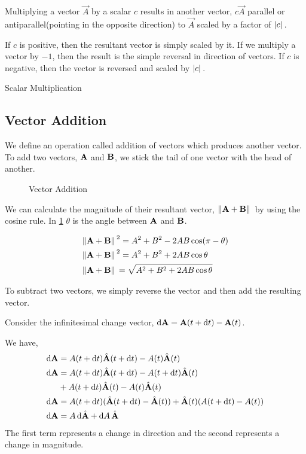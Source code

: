 Multiplying a vector \(\vec{A}\) by a scalar \(c\) results
in another vector, \(c\vec{A}\) parallel or antiparallel(pointing in the opposite 
direction) to \(\vec{A}\) scaled by a factor of \(\abs*{c}\).

If \(c\) is positive, then the resultant vector is simply scaled by it.
If we multiply a vector by \(-1\), then the result is the simple
reversal in direction of vectors. If \(c\) is negative, then the 
vector is reversed and scaled by \(\abs*{c}\). 

\begin{marginfigure}
    \centering
    \caption{Scalar Multiplication}
\end{marginfigure}

\subsection{Vector Addition}

We define an operation called addition of vectors which produces another vector.
To add two vectors, \(\boldsymbol{\mathbf{A}}\) and \(\boldsymbol{\mathbf{B}}\), we stick the tail
of one vector with the head of another. 

\begin{figure}[H]
    \centering
    {}
    \label{fig: vectoradd}
    \caption{Vector Addition}
\end{figure}

We can calculate the magnitude of their resultant vector, \(\norm*{\boldsymbol{\mathbf{A}} + \boldsymbol{\mathbf{B}}}\)
by using the cosine rule. In \cref{fig: vectoradd} \(\theta\) is the angle between 
\(\boldsymbol{\mathbf{A}}\) and \(\boldsymbol{\mathbf{B}}\).

\begin{align*}
    &\norm*{\boldsymbol{\mathbf{A}} + \boldsymbol{\mathbf{B}}}^2 = A^2 + B^2 - 2AB\cos(\pi - \theta) \\
    &\norm*{\boldsymbol{\mathbf{A}} + \boldsymbol{\mathbf{B}}}^2 = A^2 + B^2 + 2AB\cos\theta \\
    &\norm*{\boldsymbol{\mathbf{A}} + \boldsymbol{\mathbf{B}}} = \sqrt{A^2 + B^2 + 2AB\cos\theta}
\end{align*}
 
To subtract two vectors, we simply reverse the vector and then add the resulting vector.

\begin{example}
    Consider the infinitesimal change vector, \(\dd{\boldsymbol{\mathbf{A}}} = \boldsymbol{\mathbf{A}}(t + \dd{t}) - \boldsymbol{\mathbf{A}}(t)\).
    
    We have, 
    \begin{align*}
        \dd{\boldsymbol{\mathbf{A}}} &= A(t + \dd{t}){\hat{\boldsymbol{\mathbf{A}}}}(t + \dd{t}) - A(t){\hat{\boldsymbol{\mathbf{A}}}}(t) \\
        \dd{\boldsymbol{\mathbf{A}}} &= A(t + \dd{t}){\hat{\boldsymbol{\mathbf{A}}}}(t + \dd{t}) - A(t + \dd{t}){\hat{\boldsymbol{\mathbf{A}}}}(t) \\ 
        & + A(t + \dd{t}){\hat{\boldsymbol{\mathbf{A}}}}(t) - A(t){\hat{\boldsymbol{\mathbf{A}}}}(t) \\
        \dd{\boldsymbol{\mathbf{A}}} &= A(t + \dd{t})({\hat{\boldsymbol{\mathbf{A}}}}(t + \dd{t}) - {\hat{\boldsymbol{\mathbf{A}}}}(t)) + {\hat{\boldsymbol{\mathbf{A}}}}(t)(A(t + \dd{t}) - A(t)) \\
        \dd{\boldsymbol{\mathbf{A}}} &= A\dd{{\hat{\boldsymbol{\mathbf{A}}}}} + \dd{A}{\hat{\boldsymbol{\mathbf{A}}}} 
    \end{align*}
The first term represents a change in direction and the second represents a change in 
magnitude.
\end{example}

